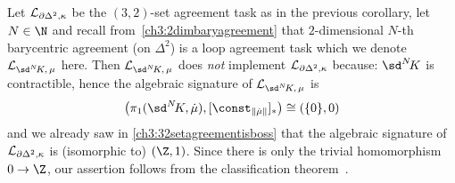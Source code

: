 \begin{thCorollary}
    Let $\mathcal{L}_{\partial\Delta^2,\kappa}$ be the $(3,2)$-set agreement task as
    in the previous corollary, let $N\in\N$ and recall
    from~\cref{ch3:2dimbaryagreement} that $2$-dimensional $N$-th barycentric
    agreement (on $\Delta^2$) is a loop agreement task which we denote
    $\Loop{\sdNK,\,\mu}$ here. Then $\Loop{\sdNK,\,\mu}$ does \emph{not}
    implement $\mathcal{L}_{\partial\Delta^2,\kappa}$ because: $\sdNK$ is
    contractible, hence the algebraic signature of $\Loop{\sdNK,\,\mu}$ is
    \[ \bigl( \pi_1(\sdNK,\dot\mu), [\const_{\geom{\dot\mu}}]_\ast
        \bigr) \cong (\{0\}, 0)
    \]
    and we already saw in \cref{ch3:32setagreementisboss} that the algebraic
    signature of $\mathcal{L}_{\partial\Delta^2,\kappa}$ is (isomorphic to) $(\Z,1)$.
    Since there is only the trivial homomorphism $0\to\Z$, our assertion follows
    from the classification theorem~.
\end{thCorollary}
